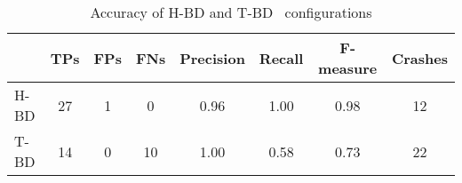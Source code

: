 \begin{table}
\begin{small}
\begin{center}
\begin{tabular}{|l||c|c|c|c|c|c|c|}
\hline
      & TPs & FPs & FNs & Precision & Recall & F-measure & Crashes \\
\hline
\hline
 H-BD  & 27  & 1    & 0   &  0.96 & 1.00 & 0.98 & 12 \\
\hline
 T-BD & 14    &  0   &   10      & 1.00 & 0.58 & 0.73 & 22 \\
 \hline
\end{tabular}
 \end{center}
 \vspace{-0.1in}
 \caption{\label{Ta:realworldAccuracy}Accuracy of H-BD and T-BD \Tool\ configurations}
\end{small}
\end{table}


